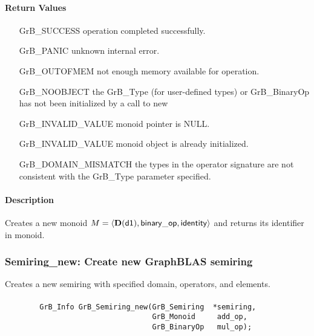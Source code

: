 \paragraph{Return Values}

\begin{itemize}[leftmargin=2.1in]
\item[{\sf GrB\_SUCCESS}]           operation completed successfully.
\item[{\sf GrB\_PANIC}]             unknown internal error.
\item[{\sf GrB\_OUTOFMEM}]          not enough memory available for operation.
\item[{\sf GrB\_NOOBJECT}]          the {\sf GrB\_Type} (for user-defined types)
                                    or {\sf GrB\_BinaryOp} has not been
                                    initialized by a call to {\sf new}
\item[{\sf GrB\_INVALID\_VALUE}]    {\sf monoid} pointer is {\sf NULL}.
\item[{\sf GrB\_INVALID\_VALUE}]    {\sf monoid} object is already initialized.
\item[{\sf GrB\_DOMAIN\_MISMATCH}]  the types in the operator signature are not   
                                    consistent with the {\sf GrB\_Type} parameter specified.
\end{itemize}

\paragraph{Description}

Creates a new monoid $M = \langle \bold{D}({\sf d1}), 
{\sf binary\_op}, {\sf identity} \rangle$ and
returns its identifier in {\sf monoid}.


\subsubsection{{\sf Semiring\_new}: Create new GraphBLAS semiring}

Creates a new semiring with specified domain, operators, and elements.

\paragraph{\syntax}

\begin{verbatim}
        GrB_Info GrB_Semiring_new(GrB_Semiring  *semiring,
                                  GrB_Monoid     add_op,
                                  GrB_BinaryOp   mul_op);
\end{verbatim}

